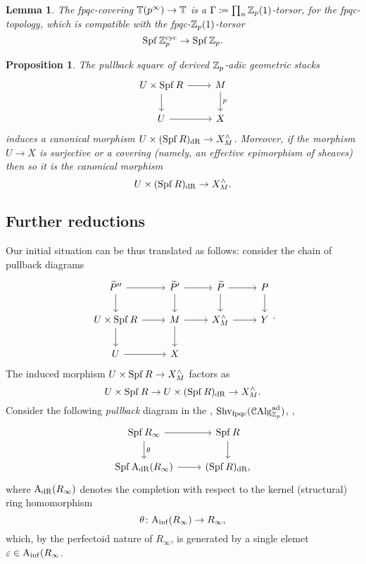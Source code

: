 \documentclass[10pt,a4paper]{amsart}
\numberwithin{equation}{subsection}
\newtheorem{lemma}[theorem]{Lemma}
\newtheorem{proposition}[theorem]{Proposition}
\theoremstyle{definition}
\begin{document}
\begin{lemma}
    The \emph{fpqc}-covering $\mathbb T(p^\infty) \to \mathbb T$ is a $\Gamma \coloneqq \prod_n \mathbb Z_p(1)$-torsor, for the \emph{fpqc}-topology, which is compatible with the \emph{fpqc}-$\mathbb Z_p(1)$-torsor
        \[
                \operatorname{Spf} \mathbb Z_p^{\mathrm{cyc}} \to \operatorname{Spf} \mathbb Z_p.  
        \]
\end{lemma}


\begin{proposition}
    The pullback square of derived $\mathbb Z_p$-adic geometric stacks
        \[
        \begin{tikzcd} 
            U \times \Spf R \ar{r} \ar{d} & M \ar{d}{p} \\
            U \ar{r} & X
        \end{tikzcd}
        \]
    induces a canonical morphism $U \times ( \operatorname{Spf} R)_{\mathrm{dR}} \to X^\wedge_M$. Moreover, if the morphism $U \to X$ is surjective or a covering (namely, an effective epimorphism of sheaves) then
    so it is the canonical morphism
        \[
                U \times (\operatorname{Spf} R)_{\mathrm{dR}} \to X^\wedge_M.  
        \]
\end{proposition}

\subsection{Further reductions} Our initial situation can be thus translated as follows: consider the chain of pullback diagrams
    \[
    \begin{tikzcd}
        \tP'' \ar{r} \ar{d} & \tP' \ar{r} \ar{d} & \tP \ar{r} \ar{d} & P \ar{d} \\
        U \times \Spf R \ar{r} \ar{d} & M \ar{r} \ar{d} & X^\wedge_M \ar{r} & Y \\
        U \ar{r} & X & &
    \end{tikzcd}.
    \]
The induced morphism $U \times \operatorname{Spf} R \to X^\wedge_M$ factors as
    \begin{equation} \label{diag1}
            U \times \operatorname{Spf} R \to U \times (\operatorname{Spf} R)_{\mathrm{dR}} \to X^\wedge_M . 
    \end{equation}
Consider the following \emph{pullback} diagram in the \infcat, $\mathrm{Shv}_{\mathrm{fpqc}}(\mathcal C \mathrm{Alg}^{\mathrm{ad}}_{\mathbb Z_p})$, ,
    \[
    \begin{tikzcd}
            \Spf R_\infty \ar{r} \ar{d}{\theta} & \Spf R \ar{d} \\ 
            \Spf \AdR (R_\infty) \ar{r} & (\Spf R)_\dR,
    \end{tikzcd}
    \]
where  $\mathrm{A}_{\mathrm{dR}}(R_\infty)$ denotes the completion with respect to the kernel (structural) ring homomorphism 
    \[
        \theta \colon \mathrm{A}_{\mathrm{inf}} (R_\infty) \to R_\infty, 
    \]
which, by the perfectoid nature of $R_\infty$, is generated by a single elemet $\varepsilon \in \mathrm{A}_{\mathrm{inf}}(R_\infty$.
\end{document}
